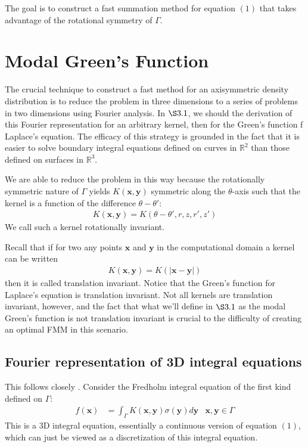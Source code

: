 \documentclass[11pt, oneside]{article}   	%
\begin{document}
The goal is to construct a fast summation method for equation $(1)$ that takes advantage of the rotational symmetry of $\Gamma$.

\section{Modal Green's Function}

The crucial technique to construct a fast method for an axisymmetric density distribution is to reduce the problem in three dimensions to a series of problems in two dimensions using Fourier analysis. In $\S3.1$, we should the derivation of this Fourier representation for an arbitrary kernel, then for the Green's function f Laplace's equation. The efficacy of this strategy is grounded in the fact that it is easier to solve boundary integral equations defined on curves in $\mathbb{R}^2$ than those defined on surfaces in $\mathbb{R}^3$.

We are able to reduce the problem in this way because the rotationally symmetric nature of $\Gamma$ yields $K(\mathbf{x},\mathbf{y})$ symmetric along the $\theta$-axis such that the kernel is a function of the difference $\theta-\theta'$:
\begin{align*}
K(\mathbf{x},\mathbf{y})=K(\theta-\theta',r,z,r',z')
\end{align*}
We call such a kernel rotationally invariant.

Recall that if for two any points $\mathbf{x}$ and $\mathbf{y}$ in the computational domain a kernel can be written
\begin{align*}
K(\mathbf{x},\mathbf{y}) = K(|\mathbf{x}-\mathbf{y}|)
\end{align*}
then it is called translation invariant. Notice that the Green's function for Laplace's equation is translation invariant. Not all kernels are translation invariant, however, and the fact that what we'll define in $\S3.1$ as the modal Green's function is not translation invariant is crucial to the difficulty of creating an optimal FMM in this scenario.

\subsection{Fourier representation of 3D integral equations}
This follows closely \cite{YYM}.
Consider the Fredholm integral equation of the first kind defined on $\Gamma$:
\begin{align}
f(\mathbf{x}) &= \int_\Gamma K(\mathbf{x},\mathbf{y})\sigma(\mathbf{y})d\mathbf{y} &\mathbf{x},\mathbf{y}\in\Gamma
\end{align}
This is a 3D integral equation, essentially a continuous version of equation $(1)$, which can just be viewed as a discretization of this integral equation.
\end{document}

